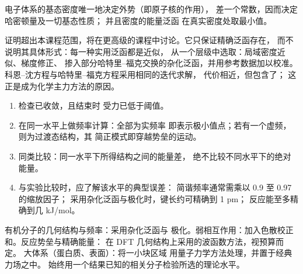 \begin{theorem}\label{thm:b3:computational-chemistry:hohenberg-kohn}
电子体系的基态密度唯一地决定外势（即原子核的作用），
差一个常数，因而决定哈密顿量及一切基态性质；
并且密度的能量泛函
在真实密度处取最小值。
\end{theorem}
\admitted

证明超出本课程范围，将在更高级的课程中讨论。它只保证精确泛函存在，
而不说明其具体形式：每一种实用泛函都是近似，
从一个层级中选取：局域密度近似、梯度修正、
掺入部分哈特里–福克交换的杂化泛函，并用参考数据加以校准。
科恩–沈方程与哈特里–福克方程采用相同的迭代求解，
代价相近，但包含了；
这正是成为化学主力方法的原因。

\begin{method}[阅读计算结果]\label{met:b3:computational-chemistry:read-calculation}
\begin{enumerate}
  \item 检查已收敛，且结束时
        受力已低于阈值。
  \item 在同一水平上做频率计算：全部为实频率
        即表示极小值点；若有一个虚频，则为过渡态结构，其
        简正模式即穿越势垒的运动。
  \item 同类比较：同一水平下所得结构之间的能量差，
        绝不比较不同水平下的绝对能量。
  \item 与实验比较时，应了解该水平的典型误差：
        简谐频率通常需乘以 0.9 至 0.97 的缩放因子；
        采用杂化泛函与极化时，键长约可精确到 1 pm；
        反应能至多精确到几 \unit{kJ/mol}。
\end{enumerate}
\end{method}

\begin{method}[选择理论水平]\label{met:b3:computational-chemistry:choose-level}
有机分子的几何结构与频率：采用杂化泛函与
极化。弱相互作用：加入色散校正
和。反应势垒与精确能量：
在 DFT 几何结构上采用的波函数方法，视预算而定。
大体系（蛋白质、表面）：将一小块区域
用量子力学方法处理，并置于经典力场之中。
始终用一个结果已知的相关分子检验所选的理论水平。
\end{method}

